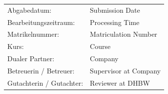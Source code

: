 \documentclass{scrbook} %
\newcommand{\autor}{Your Name}
\newcommand{\abgabe}{Submission Date}
\newcommand{\bearbeitungszeitraum}{Processing Time}
\newcommand{\matrikelnr}{Matriculation Number}
\newcommand{\kurs}{Course}
\newcommand{\firma}{Company}
\newcommand{\betreuerfirma}{Supervisor at Company}
\newcommand{\gutachterdhbw}{Reviewer at DHBW}
\newcommand{\jahr}{Year}
\begin{document}
\begin{titlepage}
\begin{flushleft}
{\fontsize{12pt}{14pt}\selectfont
\begin{tabular}{ll}
Abgabedatum:                    & \quad \abgabe \\
Bearbeitungszeitraum:           & \quad \bearbeitungszeitraum   \\ 
Matrikelnummer:                 & \quad \matrikelnr \\ 
Kurs:                           & \quad \kurs \\
Dualer Partner:                 & \quad \firma \\ %
Betreuerin / Betreuer:          & \quad \betreuerfirma \\ %
Gutachterin / Gutachter:        & \quad \gutachterdhbw \\ [2ex] %
\end{tabular}
}
\end{flushleft}
\end{titlepage}

%

\hypersetup{pageanchor=true}

%
%
%
%
\end{document}
